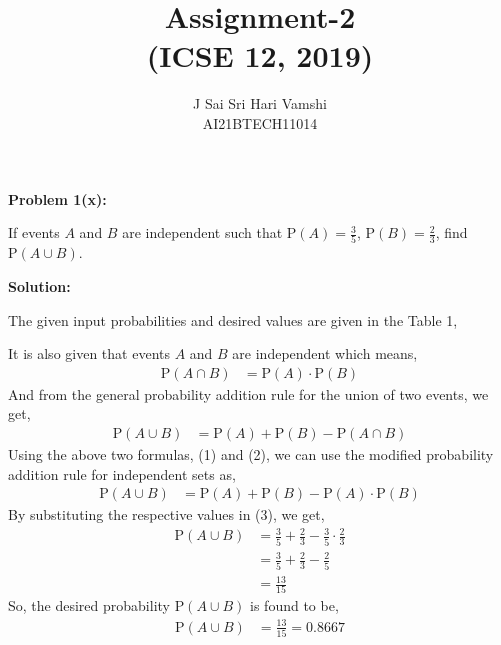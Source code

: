 \documentclass[journal,12pt,twocolumn]{article}\usepackage[margin=1.25 in]{geometry}
\title{\LARGE{\textbf{Assignment-2}\\(ICSE 12, 2019)}}
\author{\normalsize J Sai Sri Hari Vamshi\\ \footnotesize AI21BTECH11014}
\date{}
\providecommand{\pr}[1]{\ensuremath{\text{P}\left(#1\right)}}
\begin{document}
\maketitle
\begin{center}
    \textbf{\large Problem 1(x):}
\end{center}
\noindent If events $A$ and $B$ are independent such that $\pr{A} = \frac{3}{5}$, $\pr{B} = \frac{2}{3}$, find $\pr{A \cup B}$.

\begin{center}
    \textbf{\large Solution:}
\end{center}

\noindent The given input probabilities and desired values are given in the Table 1,
\begin{center}
\begin{table}[h!]
\label{table:table1}

\caption{}
\end{table}
\end{center}
\noindent It is also given that events $A$ and $B$ are independent which means,
\begin{align}
\pr{A \cap B} & = \pr A \cdot \pr B
\end{align}
\noindent And from the general probability addition rule for the union of two events, we get,
\begin{align}
\pr{A \cup B} & = \pr A + \pr B - \pr{A \cap B}
\end{align}
\noindent Using the above two formulas, (1) and (2), we can use the modified probability addition rule for independent sets as,
\begin{align}
\pr{A \cup B} & = \pr A + \pr B - \pr A \cdot \pr B
\end{align}
\noindent By substituting the respective values in (3), we get,
\begin{align*}
\pr{A \cup B} & = \frac{3}{5} + \frac{2}{3} - \frac{3}{5} \cdot \frac{2}{3} \\
& = \frac{3}{5} + \frac{2}{3} - \frac{2}{5}\\
& = \frac{13}{15}
\end{align*}
\noindent So, the desired probability $\pr{A \cup B}$ is found to be,
\begin{align*}
\pr{A \cup B} & = \frac{13}{15} = 0.8667
\end{align*}
\end{document}
